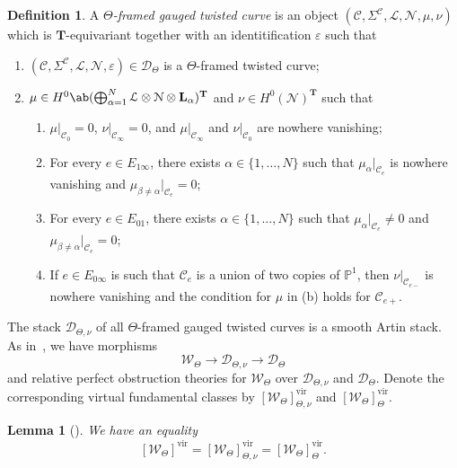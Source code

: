 \documentclass{amsart}
\newtheorem{lem}[thm]{Lemma}
\theoremstyle{definition}
\newtheorem{defn}[thm]{Definition}
\theoremstyle{remark}
\theoremstyle{plain}
\theoremstyle{definition}
\theoremstyle{remark}
\newcommand{\T}{\mathbf{T}}
\renewcommand{\P}{\mathbb{P}}
\newcommand{\ep}{\varepsilon}
\newcommand{\mc}[1]{\mathcal{#1}}
\newcommand{\mbf}[1]{\mathbf{#1}}
\newcommand{\mr}[1]{\mathrm{#1}}
\newcommand{\1}{\mathbf{1}}
\newcommand{\2}{\mathbf{2}}
\newcommand{\3}{\mathbf{3}}
\newcommand{\vir}{\mr{vir}}
\begin{document}
\begin{defn}
    A \textit{$\Theta$-framed gauged twisted curve} is an object $(\mc{C}, \Sigma^{\mc{C}}, \mc{L}, \mc{N}, \mu, \nu)$ which is $\T$-equivariant together with an identitification $\ep$ such that
    \begin{enumerate}
        \item $(\mc{C}, \Sigma^{\mc{C}}, \mc{L}, \mc{N}, \ep) \in \mc{D}_{\Theta}$ is a $\Theta$-framed twisted curve;
        \item $\mu \in H^0\ab(\bigoplus_{\alpha=1}^N \mc{L}\otimes \mc{N} \otimes \mbf{L}_{\alpha})^{\T}$ and $\nu \in H^0(\mc{N})^{\T}$ such that
            \begin{enumerate}
                \item $\mu|_{\mc{C}_0} = 0$, $\nu|_{\mc{C}_{\infty}} = 0$, and $\mu|_{\mc{C}_{\infty}}$ and $\nu|_{\mc{C}_0}$ are nowhere vanishing;
                \item For every $e \in E_{1\infty}$, there exists $\alpha \in \{1, \ldots, N \}$ such that  $\mu_{\alpha}|_{\mc{C}_e}$ is nowhere vanishing and $\mu_{\beta\neq\alpha}|_{\mc{C}_e} = 0$;
                \item For every $e \in E_{01}$, there exists $\alpha \in \{1, \ldots, N \}$ such that  $\mu_{\alpha}|_{\mc{C}_e}\neq 0$ and $\mu_{\beta\neq\alpha}|_{\mc{C}_e} = 0$;
                \item If $e \in E_{0\infty}$ is such that $\mc{C}_e$ is a union of two copies of $\P^1$, then $\nu|_{\mc{C}_{e-}}$ is nowhere vanishing and the condition for $\mu$ in (b) holds for $\mc{C}_{e+}$.
            \end{enumerate}
    \end{enumerate}
\end{defn}

The stack $\mc{D}_{\Theta, \nu}$ of all $\Theta$-framed gauged twisted curves is a smooth Artin stack. As in~\cite[\S 3]{msp3}, we have morphisms
\[ \mc{W}_{\Theta} \to \mc{D}_{\Theta, \nu} \to \mc{D}_{\Theta} \]
and relative perfect obstruction theories for $\mc{W}_{\Theta}$ over $\mc{D}_{\Theta, \nu}$ and $\mc{D}_{\Theta}$. Denote the corresponding virtual fundamental classes by $[\mc{W}_{\Theta}]^{\vir}_{\Theta, \nu}$ and $[\mc{W}_{\Theta}]^{\vir}_{\Theta}$.

\begin{lem}[{\cite[Proposition 3.4]{msp3}}]
    We have an equality
    \[ [\mc{W}_{\Theta}]^{\vir} = [\mc{W}_{\Theta}]^{\vir}_{\Theta, \nu} = [\mc{W}_{\Theta}]^{\vir}_{\Theta}. \]
\end{lem}
\end{document}
